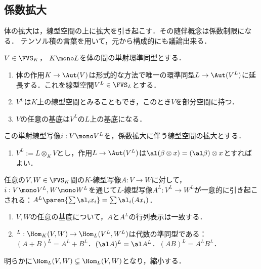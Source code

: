 \documentclass[uplatex, dvipdfmx]{jsreport}
\begin{document}
\subsection{係数拡大}

\begin{tcolorbox}[colframe=ForestGreen, colback=ForestGreen!10!white,breakable,colbacktitle=ForestGreen!40!white,coltitle=black,fonttitle=\bfseries\sffamily,
title=]
    体の拡大は，線型空間の上に拡大を引き起こす．その随伴概念は係数制限になる．
    テンソル積の言葉を用いて，元から構成的にも議論出来る．
\end{tcolorbox}

\begin{proposition}[係数拡大に伴う線型空間の拡大]
    $V\in\FVS_K$，
    $K\mono L$を体の間の単射環準同型とする．
    \begin{enumerate}
        \item 体の作用$K\to\Aut(V)$は形式的な方法で唯一の環準同型$L\to\Aut(V^L)$に延長する．これを線型空間$V^L\in\FVS_L$とする．
        \item $V^L$は$K$上の線型空間とみることもでき，このとき$V$を部分空間に持つ．
        \item $V$の任意の基底は$V^L$の$L$上の基底になる．
    \end{enumerate}
    この単射線型写像$i:V\mono V^L$を，係数拡大に伴う線型空間の拡大とする．
\end{proposition}
\begin{Proof}\mbox{}
    \begin{enumerate}
        \item $V^L:=L\otimes_KV$とし，作用$L\to\Aut(V^L)$は$\al(\beta\otimes x)=(\al\beta)\otimes x$とすればよい．
    \end{enumerate}
\end{Proof}

\begin{proposition}
    任意の$V,W\in\FVS_K$間の$K$-線型写像$A:V\to W$に対して，$i:V\mono V^L,W\mono W^L$を通じて$L$-線型写像$A^L:V^L\to W^L$が一意的に引き起こされる：$A^L\paren{\sum\al_i x_i}=\sum\al_i(Ax_i)$．
    \begin{enumerate}
        \item $V,W$の任意の基底について，$A$と$A^L$の行列表示は一致する．
        \item ${}^L:\Hom_K(V,W)\to\Hom_L(V^L,W^L)$は代数の準同型である：
        $(A+B)^L=A^L+B^L$．$(\al A)^L=\al A^L$．$(AB)^L=A^LB^L$．
    \end{enumerate}
\end{proposition}
\begin{remarks}
    明らかに$\Hom_L(V,W)\subsetneq\Hom_L(V,W)$となり，縮小する．
\end{remarks}
\end{document}
